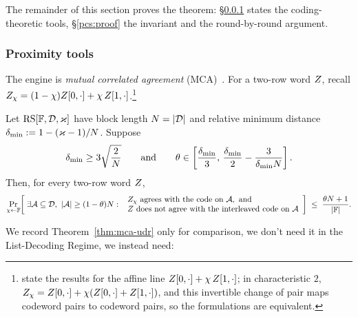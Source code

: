 The remainder of this section proves the theorem: \S\ref{sec:tools} states the coding-theoretic tools, \S\ref{pcs:proof} the invariant and the round-by-round argument.

\subsubsection{Proximity tools}\label{sec:tools}

The engine is \emph{mutual correlated agreement} (MCA)~\cite{ACFY25}. For a two-row word $Z$, recall $Z_\chi = (1-\chi)Z[0,\cdot] + \chi\,Z[1,\cdot]$.\footnote{\cite{BCHKS25} state the results for the affine line $Z[0,\cdot] + \chi\,Z[1,\cdot]$; in characteristic $2$, $Z_\chi = Z[0,\cdot] + \chi(Z[0,\cdot] + Z[1,\cdot])$, and this invertible change of pair maps codeword pairs to codeword pairs, so the formulations are equivalent.}

\begin{theorem}\label{thm:mca-udr}
Let $\mathrm{RS}[\mathbb{F},\mathcal{D},\varkappa]$ have block length $N = |\mathcal{D}|$ and relative minimum distance $\delta_{\min} := 1 - (\varkappa-1)/N$. Suppose
\[
\delta_{\min} \ge 3\sqrt{\frac{2}{N}}
\qquad\text{and}\qquad
\theta \in \left[\frac{\delta_{\min}}{3},\,\frac{\delta_{\min}}{2} - \frac{3}{\delta_{\min} N}\right].
\]
Then, for every two-row word $Z$,
\[
\Pr_{\chi \leftarrow \mathbb{F}}\!\left[\; \exists \mathcal{A} \subseteq \mathcal{D},\ |\mathcal{A}| \ge (1-\theta) N :\ \begin{array}{l} Z_\chi \text{ agrees with the code on } \mathcal{A}, \text{ and} \\ Z \text{ does not agree with the interleaved code on } \mathcal{A} \end{array} \right]
\;\le\; \frac{\theta N + 1}{|\mathbb{F}|}.
\]
\end{theorem}

We record Theorem~\ref{thm:mca-udr} only for comparison, we don't need it in the List-Decoding Regime, we instead need:

